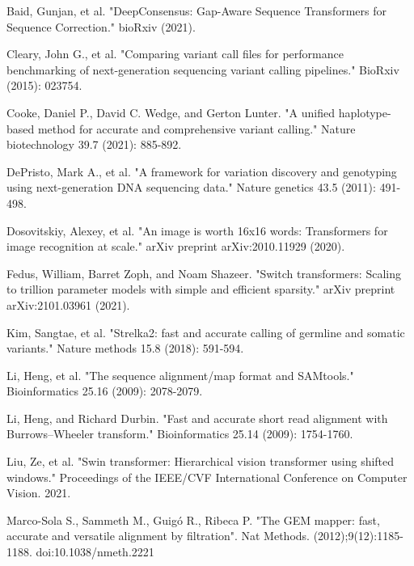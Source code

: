 \documentclass[]{article}
\begin{document}
\vspace{8pt}
Baid, Gunjan, et al. "DeepConsensus: Gap-Aware Sequence Transformers for Sequence Correction." bioRxiv (2021).

\vspace{8pt}
Cleary, John G., et al. "Comparing variant call files for performance benchmarking of next-generation sequencing variant calling pipelines." BioRxiv (2015): 023754.

\vspace{8pt}
Cooke, Daniel P., David C. Wedge, and Gerton Lunter. "A unified haplotype-based method for accurate and comprehensive variant calling." Nature biotechnology 39.7 (2021): 885-892.

\vspace{8pt}
DePristo, Mark A., et al. "A framework for variation discovery and genotyping using next-generation DNA sequencing data." Nature genetics 43.5 (2011): 491-498.
 
\vspace{8pt}
Dosovitskiy, Alexey, et al. "An image is worth 16x16 words: Transformers for image recognition at scale." arXiv preprint arXiv:2010.11929 (2020).

\vspace{8pt}
Fedus, William, Barret Zoph, and Noam Shazeer. "Switch transformers: Scaling to trillion parameter models with simple and efficient sparsity." arXiv preprint arXiv:2101.03961 (2021).

\vspace{8pt}
Kim, Sangtae, et al. "Strelka2: fast and accurate calling of germline and somatic variants." Nature methods 15.8 (2018): 591-594.

\vspace{8pt}
Li, Heng, et al. "The sequence alignment/map format and SAMtools." Bioinformatics 25.16 (2009): 2078-2079.

\vspace{8pt}
Li, Heng, and Richard Durbin. "Fast and accurate short read alignment with Burrows–Wheeler transform." Bioinformatics 25.14 (2009): 1754-1760.

\vspace{8pt}
Liu, Ze, et al. "Swin transformer: Hierarchical vision transformer using shifted windows." Proceedings of the IEEE/CVF International Conference on Computer Vision. 2021.

\vspace{8pt}
Marco-Sola S., Sammeth M., Guigó R., Ribeca P. "The GEM mapper: fast, accurate and versatile alignment by filtration". Nat Methods. (2012);9(12):1185-1188. doi:10.1038/nmeth.2221
\end{document}
